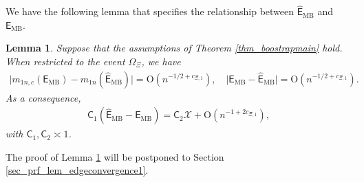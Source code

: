 \documentclass[12pt]{article}
\theoremstyle{plain}
\newtheorem{lemma}{Lemma}[section]
\numberwithin{equation}{section}
\begin{document}
We have the following lemma that specifies the relationship between $\widehat{\mathsf{E}}_{\mathrm{MB}}$ and $\mathsf{E}_{\mathrm{MB}}$.
\begin{lemma}\label{lem_edgeconvergence1}
	Suppose that the assumptions of Theorem \ref{thm_boostrapmain} hold. When restricted to the event $\Omega_{\Xi}$, we have
	\begin{align}\label{eq_edgeconvergence_firststatement}
		\big|m_{1n,c}(\mathsf{E}_{\mathrm{MB}})-m_{1n}(\widehat{\mathsf{E}}_{\mathrm{MB}})\big|=\mathrm{O}(n^{-1/2+c_{\Xi,1}}),\quad \big|\mathsf{E}_{\mathrm{MB}}-\widehat{\mathsf{E}}_{\mathrm{MB}}\big|=\mathrm{O}(n^{-1/2+c_{\Xi,1}}).
	\end{align}
	As a consequence,
	\begin{align}\label{eq_edgeconvergence_secondstatement}
		\mathsf{C}_1(\widehat{\mathsf{E}}_{\mathrm{MB}}-\mathsf{E}_{\mathrm{MB}})=\mathsf{C}_2\mathcal{X}+\mathrm{O}(n^{-1+2c_{\Xi,1}}),
	\end{align}
	with $\mathsf{C}_1,\mathsf{C}_2\asymp1$.
\end{lemma}
The proof of Lemma \ref{lem_edgeconvergence1} will be postponed to Section \ref{sec_prf_lem_edgeconvergence1}.
\end{document}
